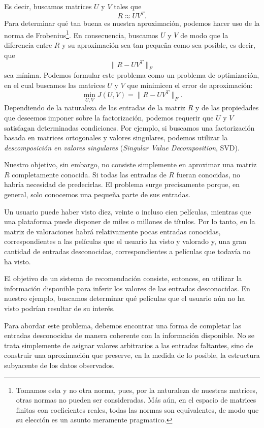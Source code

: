 Es decir, buscamos matrices $U$ y $V$ tales que
$$R\approx UV^T.$$
Para determinar qué tan buena es nuestra aproximación, podemos hacer uso de la norma de Frobenius\footnote{Tomamos esta y no otra norma, pues, por la naturaleza de nuestras matrices, otras normas no pueden ser consideradas. Más aún, en el espacio de matrices finitas con coeficientes reales, todas las normas son equivalentes, de modo que su elección es un asunto meramente pragmatico.}. En consecuencia, buscamos $U$ y $V$ de modo que la diferencia entre $R$ y su aproximación sea tan pequeña como sea posible, es decir, que
$$\|R-UV^T\|_F$$
sea mínima.
Podemos formular este problema como un problema de optimización, en el cual buscamos las matrices $U$ y $V$ que minimicen el error de aproximación:
$$\min_{U,V} J(U,V)=\|R-UV^T\|_F.$$
Dependiendo de la naturaleza de las entradas de la matriz $R$ y de las propiedades que deseemos imponer sobre la factorización, podemos requerir que $U$ y $V$ satisfagan determinadas condiciones. Por ejemplo, si buscamos una factorización basada en matrices ortogonales y valores singulares, podemos utilizar la \textit{descomposición en valores singulares} (\textit{Singular Value Decomposition}, SVD).


Nuestro objetivo, sin embargo, no consiste simplemente en aproximar una matriz $R$ completamente conocida. Si todas las entradas de $R$ fueran conocidas, no habría necesidad de predecirlas. El problema surge precisamente porque, en general, solo conocemos una pequeña parte de sus entradas.

Un usuario puede haber visto diez, veinte o incluso cien películas, mientras que una plataforma puede disponer de miles o millones de títulos. Por lo tanto, en la matriz de valoraciones habrá relativamente pocas entradas conocidas, correspondientes a las películas que el usuario ha visto y valorado y, una gran cantidad de entradas desconocidas, correspondientes a películas que todavía no ha visto.

El objetivo de un sistema de recomendación consiste, entonces, en utilizar la información disponible para inferir los valores de las entradas desconocidas. En nuestro ejemplo, buscamos determinar qué películas que el usuario aún no ha visto podrían resultar de su interés.

Para abordar este problema, debemos encontrar una forma de completar las entradas desconocidas de manera coherente con la información disponible. No se trata simplemente de asignar valores arbitrarios a las entradas faltantes, sino de construir una aproximación que preserve, en la medida de lo posible, la estructura subyacente de los datos observados.

